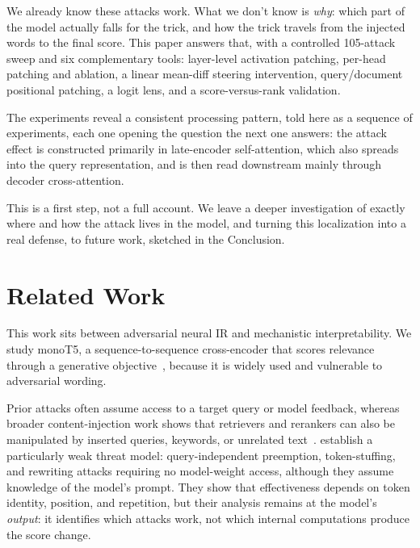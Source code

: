 \documentclass[11pt]{article}
\begin{document}
We already know these attacks work. What we don't know is \emph{why}: which
part of the model actually falls for the trick, and how the trick travels
from the injected words to the final score. This paper answers that, with
a controlled 105-attack sweep and six complementary tools: layer-level
activation patching, per-head patching and ablation, a linear mean-diff
steering intervention, query/document positional patching, a logit lens,
and a score-versus-rank validation.

The experiments reveal a consistent processing pattern, told here as a
sequence of experiments, each one opening the question the next one
answers: the attack effect is constructed primarily in late-encoder
self-attention, which also spreads into the query representation, and is
then read downstream mainly through decoder cross-attention.

This is a first step, not a full account. We leave a deeper investigation
of exactly where and how the attack lives in the model, and turning this
localization into a real defense, to future work, sketched in the
Conclusion.

\section{Related Work}

This work sits between adversarial neural IR and mechanistic
interpretability. We study monoT5, a sequence-to-sequence cross-encoder that
scores relevance through a generative objective~\citep{nogueira2020document},
because it is widely used and vulnerable to adversarial wording.

Prior attacks often assume access to a target query or model feedback,
whereas broader content-injection work shows that retrievers and rerankers
can also be manipulated by inserted queries, keywords, or unrelated
text~\citep{parry2024adversarial,tamber2025illusions}.
\citet{parry2024adversarial} establish a particularly weak threat model:
query-independent preemption, token-stuffing, and rewriting attacks requiring
no model-weight access, although they assume knowledge of the model's prompt.
They show that effectiveness depends on token identity, position, and
repetition, but their analysis remains at the model's \emph{output}: it
identifies which attacks work, not which internal computations produce the
score change.
\end{document}
